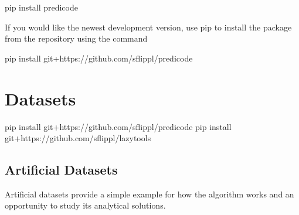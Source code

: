 \documentclass[letterpaper,10pt,english]{sphinxmanual}
\begin{document}
\begin{sphinxVerbatim}[commandchars=\\\{\}]
pip install predicode
\end{sphinxVerbatim}

If you would like the newest development version, use pip to install the package from the  repository using the command

\begin{sphinxVerbatim}[commandchars=\\\{\}]
pip install git+https://github.com/sflippl/predicode
\end{sphinxVerbatim}


\chapter{Datasets}
\label{\detokenize{usage/datasets:Datasets}}\label{\detokenize{usage/datasets::doc}}

{
\begin{sphinxVerbatim}[commandchars=\\\{\}]
\llap{\color{nbsphinxin}[1]:\,\hspace{\fboxrule}\hspace{\fboxsep}}
       
    pip install git+https://github.com/sflippl/predicode
       
       
    pip install git+https://github.com/sflippl/lazytools
       
\end{sphinxVerbatim}
}


\section{Artificial Datasets}
\label{\detokenize{usage/datasets:Artificial-Datasets}}
Artificial datasets provide a simple example for how the algorithm works and an opportunity to study its analytical solutions.
\end{document}

